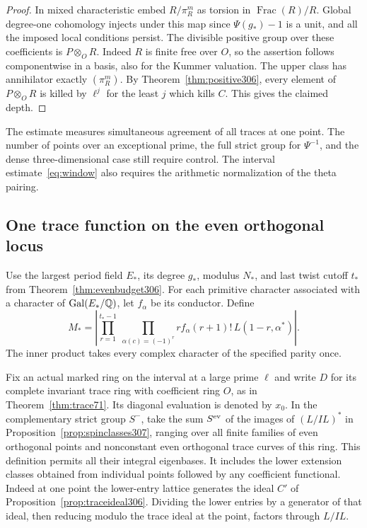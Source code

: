 \documentclass[a4paper,11pt]{article}
\theoremstyle{definition}
\theoremstyle{remark}
\numberwithin{equation}{section}
\begin{document}
\begin{proof}
In mixed characteristic embed \(R/\pi_R^m\) as torsion in
\(\operatorname{Frac}(R)/R\). Global degree-one cohomology
injects under this map since \(\Psi(g_*)-1\) is a unit, and
all the imposed local conditions persist. The divisible
positive group over these coefficients is \(P\otimes_O R\). Indeed
\(R\) is finite free over \(O\), so the assertion follows
componentwise in a basis, also for the Kummer valuation.
The upper class has annihilator exactly \((\pi_R^m)\).
By Theorem~\ref{thm:positive306}, every element of
\(P\otimes_O R\) is killed by \(\ell^j\) for the least \(j\)
which kills \(C\). This gives the claimed depth.
\end{proof}

The estimate measures simultaneous agreement of all traces at
one point. The number of points over an exceptional prime, the
full strict group for \(\Psi^{-1}\), and the dense
three-dimensional case still require control. The interval
estimate~\eqref{eq:window} also requires the arithmetic
normalization of the theta pairing.

\subsection{One trace function on the even orthogonal locus}\label{nav:I-75}
Use the largest period field \(E_*\), its degree \(g_*\),
modulus \(N_*\), and last twist cutoff \(t_*\) from
Theorem~\ref{thm:evenbudget306}. For each primitive character
associated with a character of \(\operatorname{Gal}(E_*/\mathbb Q)\),
let \(f_\alpha\) be its conductor. Define
\[
 M_*=\left|\prod_{r=1}^{t_*-1}
         \ \prod_{\alpha(c)=(-1)^r}
          r f_\alpha(r+1)!\,L(1-r,\alpha^*)\right|.
\]
The inner product takes every complex character of the
specified parity once.

Fix an actual marked ring on the interval at a large prime
\(\ell\) and write \(D\) for its complete invariant trace
ring with coefficient ring \(O\), as in
Theorem~\ref{thm:trace71}. Its diagonal evaluation is denoted
by \(x_0\). In the complementary strict group \(S^-\), take
the sum \(S^{\rm ev}\) of the images of \((L/IL)^*\) in
Proposition~\ref{prop:spinclasses307}, ranging over all finite
families of even orthogonal points and nonconstant even
orthogonal trace curves of this ring. This definition permits
all their integral eigenbases. It includes the lower extension
classes obtained from individual points followed by any
coefficient functional. Indeed at one point the lower-entry
lattice generates the ideal \(C'\) of
Proposition~\ref{prop:traceideal306}. Dividing the lower
entries by a generator of that ideal, then reducing modulo
the trace ideal at the point, factors through \(L/IL\).
\end{document}

